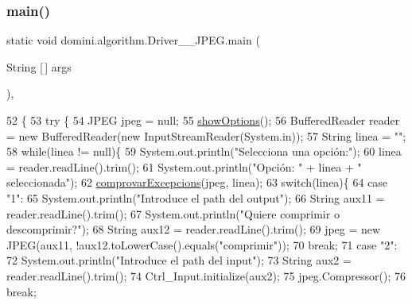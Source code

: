\subsubsection{\texorpdfstring{main()}{main()}}
{\footnotesize\ttfamily static void domini.\+algorithm.\+Driver\+\_\+\+\_\+\+J\+P\+E\+G.\+main (\begin{DoxyParamCaption}\item[{String \mbox{[}$\,$\mbox{]}}]{args }\end{DoxyParamCaption})\hspace{0.3cm}{\ttfamily [inline]}, {\ttfamily [static]}}


\begin{DoxyCode}
52                                            \{
53     \textcolor{keywordflow}{try} \{
54         JPEG jpeg = null;
55         \hyperlink{classdomini_1_1algorithm_1_1Driver____JPEG_a62ce35e061afe893bd03af9bfff41c33}{showOptions}();
56         BufferedReader reader = \textcolor{keyword}{new} BufferedReader(\textcolor{keyword}{new} InputStreamReader(System.in));
57         String linea = \textcolor{stringliteral}{""};
58         \textcolor{keywordflow}{while}(linea != null)\{
59             System.out.println(\textcolor{stringliteral}{"Selecciona una opción:"});
60             linea = reader.readLine().trim();
61             System.out.println(\textcolor{stringliteral}{"Opción: "} + linea + \textcolor{stringliteral}{" seleccionada"});
62             \hyperlink{classdomini_1_1algorithm_1_1Driver____JPEG_ae75883665dbbf55adaa8db46f2211c75}{comprovarExcepcions}(jpeg, linea);
63             \textcolor{keywordflow}{switch}(linea)\{
64                 \textcolor{keywordflow}{case} \textcolor{stringliteral}{"1"}:
65                     System.out.println(\textcolor{stringliteral}{"Introduce el path del output"});
66                     String aux11 = reader.readLine().trim();
67                     System.out.println(\textcolor{stringliteral}{"Quiere comprimir o descomprimir?"});
68                     String aux12 = reader.readLine().trim();
69                     jpeg = \textcolor{keyword}{new} JPEG(aux11, !aux12.toLowerCase().equals(\textcolor{stringliteral}{"comprimir"}));
70                 \textcolor{keywordflow}{break};
71                 \textcolor{keywordflow}{case} \textcolor{stringliteral}{"2"}:
72                     System.out.println(\textcolor{stringliteral}{"Introduce el path del input"});
73                     String aux2 = reader.readLine().trim();
74                     Ctrl\_Input.initialize(aux2);
75                     jpeg.Compressor();
76                 \textcolor{keywordflow}{break};

\end{DoxyCode}
